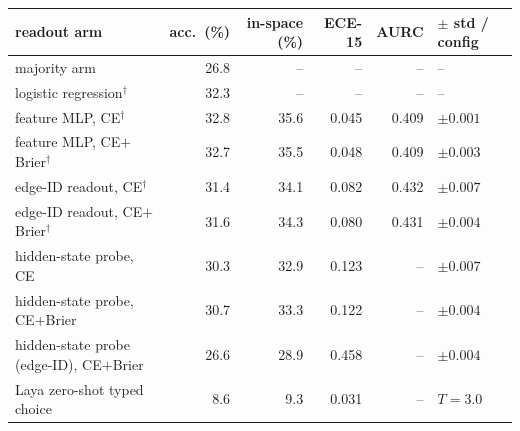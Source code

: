 {\setlength{\tabcolsep}{4.5pt}\begin{tabular}{lrrrrl}\toprule
readout arm & acc.\ (\%) & in-space (\%) & ECE-15 & AURC & $\pm$ std / config \\\midrule
majority arm & 26.8 & -- & -- & -- & -- \\
logistic regression$^{\dagger}$ & 32.3 & -- & -- & -- & -- \\
feature MLP, CE$^{\dagger}$ & 32.8 & 35.6 & 0.045 & 0.409 & $\pm 0.001$ \\
feature MLP, CE$+$Brier$^{\dagger}$ & 32.7 & 35.5 & 0.048 & 0.409 & $\pm 0.003$ \\
edge-ID readout, CE$^{\dagger}$ & 31.4 & 34.1 & 0.082 & 0.432 & $\pm 0.007$ \\
edge-ID readout, CE$+$Brier$^{\dagger}$ & 31.6 & 34.3 & 0.080 & 0.431 & $\pm 0.004$ \\
hidden-state probe, CE & 30.3 & 32.9 & 0.123 & -- & $\pm 0.007$ \\
hidden-state probe, CE$+$Brier & 30.7 & 33.3 & 0.122 & -- & $\pm 0.004$ \\
hidden-state probe (edge-ID), CE$+$Brier & 26.6 & 28.9 & 0.458 & -- & $\pm 0.004$ \\
Laya zero-shot typed choice & 8.6 & 9.3 & 0.031 & -- & $T=3.0$ \\
\bottomrule\end{tabular}}
